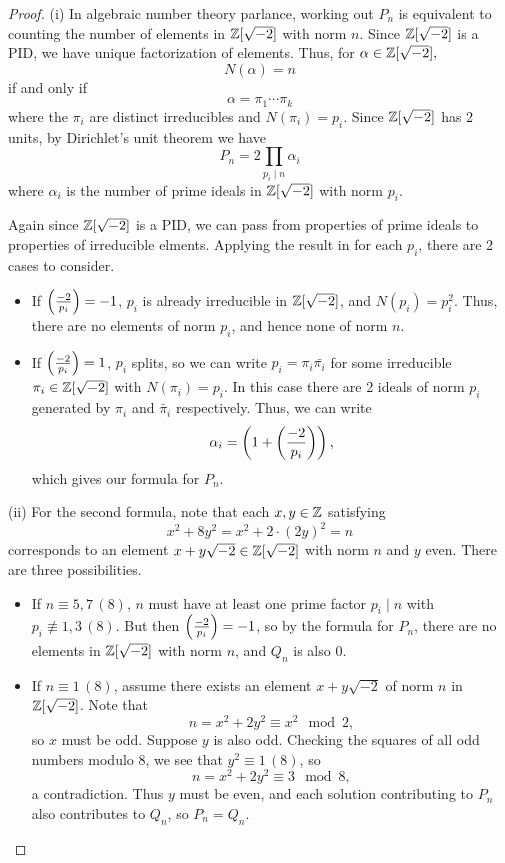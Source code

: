 \documentclass[12pt, a4paper]{report}
\begin{document}
\begin{proof}
  (i) In algebraic number theory parlance, working out $P_n$ is equivalent to
  counting the number of elements in ${\mathbb Z}[\sqrt{-2}]$ with norm $n$.
  Since ${\mathbb Z}[\sqrt{-2}]$ is
  a PID, we have unique factorization of elements. Thus, for
  $\alpha \in {\mathbb Z}[\sqrt{-2}],$
  \[N(\alpha) = n\]
  if and only if
  \[\alpha = \pi_1 \cdots \pi_k\]
  where the $\pi_i$ are distinct irreducibles and $N(\pi_i) =
  p_i.$ Since ${\mathbb Z}[\sqrt{-2}]$ has 2 units, by Dirichlet's unit theorem we have
  \[P_n = 2\prod\limits_{p_i \mid n} \alpha_i\]
  where $\alpha_i$ is the number of prime ideals in ${\mathbb Z}[\sqrt{-2}]$ with norm $p_i$.

  Again since ${\mathbb Z}[\sqrt{-2}]$ is a PID, we can pass from properties of prime
  ideals to properties of irreducible elments. Applying the result in
  \cite[Page 74, Theorem 25]{marcus} for each $p_i$, there are 2 cases
  to consider.

  \begin{itemize}
  \item If $\left(\frac{-2}{p_i}\right) = -1$, $p_i$ is already irreducible in
    ${\mathbb Z}[\sqrt{-2}]$, and $N(p_i) = p_i^2.$ Thus, there are no elements of norm
    $p_i$, and hence none of norm $n$.

  \item If $\left(\frac{-2}{p_i}\right) = 1$, $p_i$ splits, so we can write $p_i =
    \pi_i\bar{\pi_i}$ for some irreducible $\pi_i \in {\mathbb Z}[\sqrt{-2}]$ with
    $N(\pi_i) = p_i$. In this case there are 2 ideals of norm $p_i$ generated by
    $\pi_i$ and $\bar{\pi}_i$ respectively. Thus, we can write
    \[\alpha_i = \left( 1 + \left(\frac{-2}{p_i}\right) \right),\]
    which gives our formula for $P_n$.
  \end{itemize}
  (ii) For the second formula, note that each $x,y \in {\mathbb Z}$ satisfying
  \[x^2 + 8y^2 = x^2 + 2\cdot(2y)^2= n\]
  corresponds to an element $x+y\sqrt{-2} \in {\mathbb Z}[\sqrt{-2}]$ with norm $n$
  and $y$ even. There are three possibilities.

  \begin{itemize}
  \item If $n \equiv 5, 7 \,(8)$, $n$ must have at least one prime factor $p_i
    \mid n$ with $p_i \not\equiv 1,3 \,(8)$. But then $\left(\frac{-2}{p_i}\right) = -1$,
    so by the formula for $P_n$, there are no elements in ${\mathbb Z}[\sqrt{-2}]$ with
    norm $n$, and $Q_n$ is also 0.

  \item If $n \equiv 1 \, (8)$, assume there exists an element $x + y \sqrt{-2}$ of
    norm $n$ in ${\mathbb Z}[\sqrt{-2}]$. Note that
    \[n = x^2 + 2y^2 \equiv x^2 \mod{2},\] so $x$ must be odd. Suppose $y$ is
    also odd. Checking the squares of all odd numbers modulo 8, we see that $y^2
    \equiv 1 \,(8)$, so
    \[n = x^2 + 2y^2 \equiv 3 \mod{8},\] a contradiction. Thus $y$ must be even,
    and each solution contributing to $P_n$ also contributes to $Q_n$, so $P_n =
    Q_n$.


\end{itemize}
\end{proof}
\end{document}
